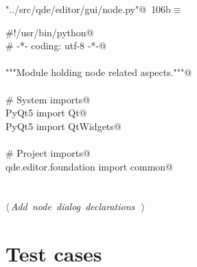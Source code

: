 \documentclass[
    a4paper,      %
    10pt,         %
    openright,    %
    notitlepage,  %
    parskip=half, %
]{scrreprt}       %
\theoremstyle{definition}                    %
\begin{document}
\begin{flushleft}
\begin{minipage}{\linewidth}
\begin{list}{}{\setlength{\itemsep}{-\parsep}\setlength{\itemindent}{-\leftmargin}}
\item{}
\end{list}
\end{minipage}\vspace{4ex}
\end{flushleft}
\begin{flushleft} \small
\begin{minipage}{\linewidth}\label{scrap174}\raggedright\small
{} \verb@"../src/qde/editor/gui/node.py"@\nobreak\ {\footnotesize {106b}}$\equiv$
\vspace{-1ex}
\begin{list}{}{} \item
\mbox{}\lstinline@#!/usr/bin/python@\\
\mbox{}\lstinline@# -*- coding: utf-8 -*-@\\
\mbox{}\lstinline@@\\
\mbox{}\lstinline@"""Module holding node related aspects."""@\\
\mbox{}\lstinline@@\\
\mbox{}\lstinline@# System imports@\\
\mbox{}\lstinline@from PyQt5 import Qt@\\
\mbox{}\lstinline@from PyQt5 import QtWidgets@\\
\mbox{}\lstinline@@\\
\mbox{}\lstinline@# Project imports@\\
\mbox{}\lstinline@from qde.editor.foundation import common@\\
\mbox{}\lstinline@@\\
\mbox{}\lstinline@@\\
\mbox{}\lstinline@@\hbox{$\langle\,${\itshape Add node dialog declarations}\nobreak\ {\footnotesize {}}$\,\rangle$}\lstinline@@\\
\mbox{}\lstinline@@{\NWsep}
\end{list}
\vspace{-1.5ex}
\footnotesize
\begin{list}{}{\setlength{\itemsep}{-\parsep}\setlength{\itemindent}{-\leftmargin}}

\item{}
\end{list}
\end{minipage}\vspace{4ex}
\end{flushleft}
\section{Test cases}
\label{sec:test-cases}
\end{document}
